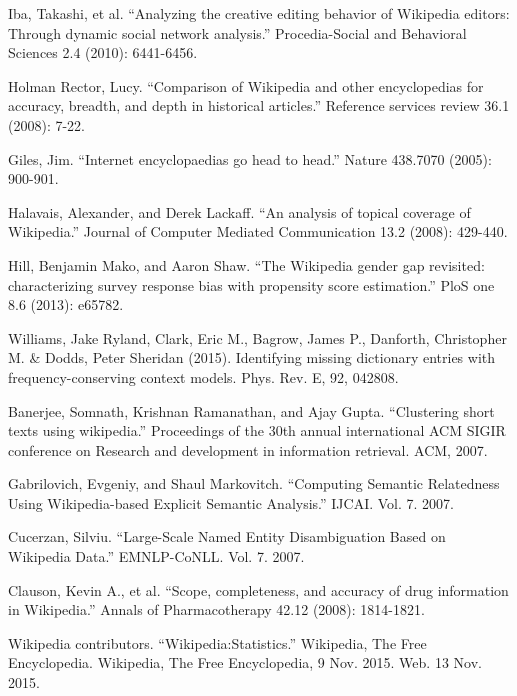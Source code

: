\documentclass[11pt]{report}
\begin{document}
\begin{thebibliography}{1}

       Iba, Takashi, et al. ``Analyzing the creative editing behavior of Wikipedia editors: Through dynamic social network analysis.'' Procedia-Social and Behavioral Sciences 2.4 (2010): 6441-6456.

       Holman Rector, Lucy. ``Comparison of Wikipedia and other encyclopedias for accuracy, breadth, and depth in historical articles.'' Reference services review 36.1 (2008): 7-22.

       Giles, Jim. ``Internet encyclopaedias go head to head.'' Nature 438.7070 (2005): 900-901.

        Halavais, Alexander, and Derek Lackaff. ``An analysis of topical coverage of Wikipedia.'' Journal of Computer Mediated Communication 13.2 (2008): 429-440.

         Hill, Benjamin Mako, and Aaron Shaw. ``The Wikipedia gender gap revisited: characterizing survey response bias with propensity score estimation.'' PloS one 8.6 (2013): e65782.

       Williams, Jake Ryland, Clark, Eric M., Bagrow, James P., Danforth, Christopher M. \& Dodds, Peter Sheridan (2015). Identifying missing dictionary entries with frequency-conserving context models. Phys. Rev. E, 92, 042808.

       Banerjee, Somnath, Krishnan Ramanathan, and Ajay Gupta. ``Clustering short texts using wikipedia.'' Proceedings of the 30th annual international ACM SIGIR conference on Research and development in information retrieval. ACM, 2007.

       Gabrilovich, Evgeniy, and Shaul Markovitch. ``Computing Semantic Relatedness Using Wikipedia-based Explicit Semantic Analysis.'' IJCAI. Vol. 7. 2007.

       Cucerzan, Silviu. ``Large-Scale Named Entity Disambiguation Based on Wikipedia Data.'' EMNLP-CoNLL. Vol. 7. 2007.

       Clauson, Kevin A., et al. ``Scope, completeness, and accuracy of drug information in Wikipedia.'' Annals of Pharmacotherapy 42.12 (2008): 1814-1821.

       Wikipedia contributors. ``Wikipedia:Statistics.'' Wikipedia, The Free Encyclopedia. Wikipedia, The Free Encyclopedia, 9 Nov. 2015. Web. 13 Nov. 2015.


\end{thebibliography}
\end{document}

